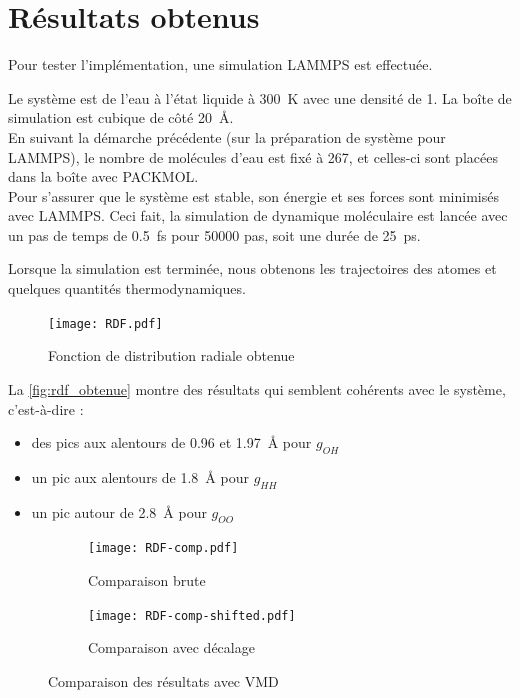 \documentclass[11pt, a4paper]{article}
\begin{document}
\section{Résultats obtenus}

Pour tester l'implémentation, une simulation LAMMPS est effectuée.

Le système est de l'eau à l'état liquide à \qty{300}{\kelvin} avec une densité de \num{1}. La boîte de simulation est cubique de côté \qty{20}{\angstrom}.\\
En suivant la démarche précédente (sur la préparation de système pour LAMMPS), le nombre de molécules d'eau est fixé à \num{267}, et celles-ci sont placées dans la boîte avec PACKMOL.\\
Pour s'assurer que le système est stable, son énergie et ses forces sont minimisés avec LAMMPS. Ceci fait, la simulation de dynamique moléculaire est lancée avec un pas de temps de \qty{.5}{\femto\second} pour \num{50000} pas, soit une durée de \qty{25}{\pico\second}.

Lorsque la simulation est terminée, nous obtenons les trajectoires des atomes et quelques quantités thermodynamiques.

\begin{figure}[hbpt]
	\centering
	\texttt{[image: RDF.pdf]}
	\caption{Fonction de distribution radiale obtenue}
	\label{fig:rdf_obtenue}
\end{figure}

La \autoref{fig:rdf_obtenue} montre des résultats qui semblent cohérents avec le système, c'est-à-dire :
\begin{itemize}
	\item des pics aux alentours de \num{.96} et \qty{1.97}{\angstrom} pour $g_{OH}$
	\item un pic aux alentours de \qty{1.8}{\angstrom} pour $g_{HH}$
	\item un pic autour de \qty{2.8}{\angstrom} pour $g_{OO}$
\end{itemize}

\begin{figure}[hptb]
	\centering
	\begin{subfigure}{\linewidth}
		\centering
		\texttt{[image: RDF-comp.pdf]}
		\caption{Comparaison brute}
		\label{fig:rdf_comp_brute}
	\end{subfigure}
	
	\begin{subfigure}{\linewidth}
		\centering
		\texttt{[image: RDF-comp-shifted.pdf]}
		\caption{Comparaison avec décalage}
		\label{fig:rdf_comp_decalee}
	\end{subfigure}
	\caption{Comparaison des résultats avec VMD}
	\label{fig:rdf_comp}
\end{figure}
\end{document}
